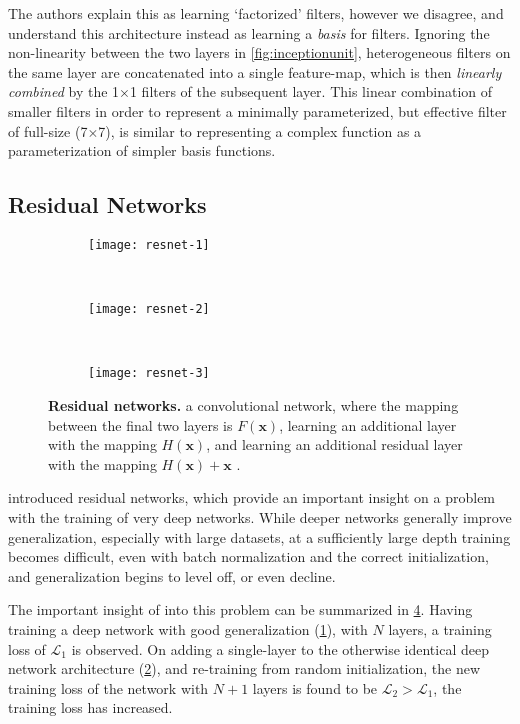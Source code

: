 \documentclass[thesis]{subfiles}
\begin{document}
The authors explain this as learning `factorized' filters, however we disagree, and understand this architecture instead as learning a \emph{basis} for filters. Ignoring the non-linearity between the two layers in \cref{fig:inceptionunit}, heterogeneous filters on the same layer are concatenated into a single feature-map, which is then \emph{linearly combined} by the 1$\times$1 filters of the subsequent layer. This linear combination of smaller filters in order to represent a minimally parameterized, but effective filter of full-size (7$\times$7), is similar to representing a complex function as a parameterization of simpler basis functions.

\subsection{Residual Networks}\label{residualnetworks}
\begin{figure}[tbp]
\begin{subfigure}[T]{0.32\textwidth}
\centering
\texttt{[image: resnet-1]}
\caption{}\label{fig:resnet-1}
\end{subfigure}
~
\begin{subfigure}[T]{0.32\textwidth}
\centering
\texttt{[image: resnet-2]}
\caption{}\label{fig:resnet-2}
\end{subfigure}
~
\begin{subfigure}[T]{0.32\textwidth}
\centering
\texttt{[image: resnet-3]}
\caption{}\label{fig:resnet-3}
\end{subfigure}
\caption[Residual networks]{\textbf{Residual networks.}  a convolutional network, where the mapping between the final two layers is $F(\mathbf{x})$,  learning an additional layer with the mapping $H(\mathbf{x})$, and  learning an additional residual layer with the mapping $H(\mathbf{x})+\mathbf{x}$ .}
\label{fig:resnet}
\end{figure}
\citet{He2015} introduced residual networks, which provide an important insight on a problem with the training of very deep networks. While deeper networks generally improve generalization, especially with large datasets, at a sufficiently large depth training becomes difficult, even with batch normalization and the correct initialization, and generalization begins to level off, or even decline.

The important insight of \citet{He2015} into this problem can be summarized in \cref{fig:resnet}. Having training a deep network with good generalization (\eg{}\cref{fig:resnet-1}), with $N$ layers, a training loss of $\mathcal{L}_1$ is observed. On adding a single-layer to the otherwise identical deep network architecture (\eg{}\cref{fig:resnet-2}), and re-training from random initialization, the new training loss of the network with $N+1$ layers is found to be $\mathcal{L}_2 > \mathcal{L}_1$, \ie the training loss has increased.
\end{document}
